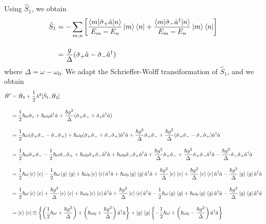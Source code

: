 Using $\hat{S}_1$, we obtain
\begin{align}
    \hat{S}_{1}
    &=-\sum_{m,n}
    \left[
    \frac{\braket{m|\hsig_+\hat{a}|n}}{E_{m}-E_{n}}\ket{m}\bra{n}
    +\frac{\braket{m|\hsig_-\hat{a}^\dagger|n}}{E_{m}-E_{n}}\ket{m}\bra{n}
    \right]\nn[10pt]
    &=\frac{g}{\Delta}(\hsig_+\hat{a}-\hsig_-\hat{a}^\dagger)
\end{align}
where $\Delta = \omega-\omega_0$.
We adapt the Schrieffer-Wolff transiformation of $\hat{S}_1$, and we obtain
\begin{align}
    \hat{H}^{\prime}
   &=\hat{H}_0
    +\frac{1}{2}\lambda^2
    [\hat{S}_1, \hat{H}_2]\nn[10pt]
    &=\frac{1}{2}\hbar\omega\hsig_z
    +\hbar\omega_0\hat{a}^\dagger\ha
    +\frac{\hbar g^2}{\Delta}(\hsig_+\hsig_-
    +\hsig_z\hat{a}^\dagger\hat{a})\nn[10pt]
    &=\frac{1}{2}\hbar\omega(\hsig_+\hsig_- - \hsig_-\hsig_+)
    +\hbar\omega_0(\hsig_+\hsig_- + \hsig_-\hsig_+)\hat{a}^\dagger\ha
    +\frac{\hbar g^2}{\Delta}\hsig_+\hsig_-
    +\frac{\hbar g^2}{\Delta}(\hsig_+\hsig_- - \hsig_-\hsig_+)\hat{a}^\dagger\hat{a}\nn[10pt]
    &=\frac{1}{2}\hbar\omega\hsig_+\hsig_- 
    - \frac{1}{2}\hbar\omega\hsig_-\hsig_+
    +\hbar\omega_0\hsig_+\hsig_- \hat{a}^\dagger\ha
    + \hbar\omega_0\hsig_-\hsig_+\hat{a}^\dagger\ha
    +\frac{\hbar g^2}{\Delta}\hsig_+\hsig_-
    +\frac{\hbar g^2}{\Delta}\hsig_+\hsig_- \hat{a}^\dagger\hat{a}
    -\frac{\hbar g^2}{\Delta} \hsig_-\hsig_+\hat{a}^\dagger\hat{a}\nn[10pt]
    &=\frac{1}{2}\hbar\omega\ket{e}\bra{e}
    - \frac{1}{2}\hbar\omega\ket{g}\bra{g}
    +\hbar\omega_0\ket{e}\bra{e} \hat{a}^\dagger\ha
    + \hbar\omega_0\ket{g}\bra{g}\hat{a}^\dagger\ha
    +\frac{\hbar g^2}{\Delta}\ket{e}\bra{e}
    +\frac{\hbar g^2}{\Delta}\ket{e}\bra{e} \hat{a}^\dagger\hat{a}
    -\frac{\hbar g^2}{\Delta} \ket{g}\bra{g}\hat{a}^\dagger\hat{a}\nn[10pt]
    &=\frac{1}{2}\hbar\omega\ket{e}\bra{e}
    +\frac{\hbar g^2}{\Delta}\ket{e}\bra{e}
    +\hbar\omega_0\ket{e}\bra{e} \hat{a}^\dagger\ha
    +\frac{\hbar g^2}{\Delta}\ket{e}\bra{e} \hat{a}^\dagger\hat{a}
    - \frac{1}{2}\hbar\omega\ket{g}\bra{g}
    + \hbar\omega_0\ket{g}\bra{g}\hat{a}^\dagger\ha
    -\frac{\hbar g^2}{\Delta} \ket{g}\bra{g}\hat{a}^\dagger\hat{a}\nn[10pt]
    &=\ket{e}\bra{e}\otimes\left\{
    \left(\frac{1}{2}\hbar\omega
    +\frac{\hbar g^2}{\Delta}
    \right)
    +\left(\hbar\omega_0
    +\frac{\hbar g^2}{\Delta} 
    \right)\hat{a}^\dagger\hat{a}
    \right\}
    +\ket{g}\bra{g}\left\{
    -\frac{1}{2}\hbar\omega
    +\left(
    \hbar\omega_0
    -\frac{\hbar g^2}{\Delta}
    \right)\hat{a}^\dagger\hat{a}
    \right\}\nn[10pt]
\end{align}

